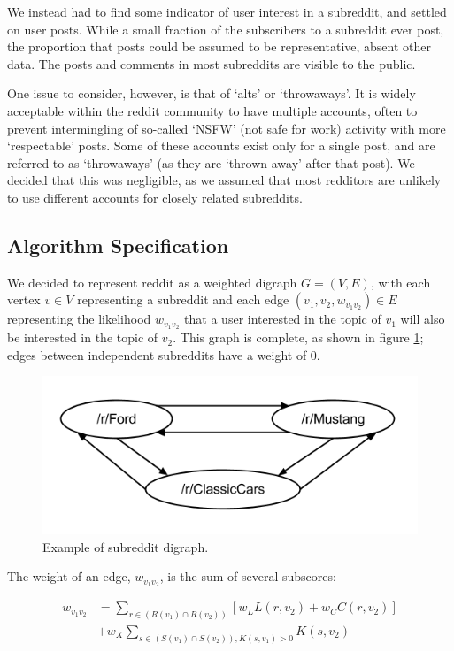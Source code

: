 \documentclass[journal, draftclsnofoot]{./styles/IEEEtran}
\begin{document}
We instead had to find some indicator of user interest in a subreddit,
and settled on user posts. While a small fraction of the subscribers to
a subreddit ever post, the proportion that posts could be assumed to be
representative, absent other data. The posts and comments in most
subreddits are visible to the public.

One issue to consider, however, is that of `alts' or `throwaways'.
It is widely acceptable within the reddit community to have multiple
accounts, often to prevent intermingling of so-called `NSFW' (not safe
for work) activity with more `respectable' posts. Some of these accounts
exist only for a single post, and are referred to as `throwaways' (as
they are `thrown away' after that post). We decided that this was
negligible, as we assumed that most redditors are unlikely to use
different accounts for closely related subreddits.

\subsection{Algorithm Specification}

We decided to represent reddit as a weighted digraph $G = (V, E)$, with
each vertex $v \in V$ representing a subreddit and each edge $(v_1, v_2,
w_{v_1v_2}) \in E$ representing the likelihood $w_{v_1v_2}$ that a user
interested in the topic of $v_1$ will also be interested in the topic of
$v_2$. This graph is complete, as shown in figure \ref{fig:graph}; edges
between independent subreddits have a weight of 0.

\begin{figure}[!t]
\centering
\includegraphics[width=\columnwidth]{graph.png}
\caption{Example of subreddit digraph.}
\label{fig:graph}
\end{figure}

The weight of an edge, $w_{v_1v_2}$, is the sum of several subscores:

\begin{align*}
w_{v_1v_2} &= \sum_{r \in (R(v_1) \cap R(v_2))} \left[ w_L L(r, v_2) + w_C C(r,
v_2) \right]\\
&+ w_X \sum_{s \in (S(v_1) \cap S(v_2)), K(s, v_1) > 0} K(s, v_2)
\end{align*}
\end{document}
